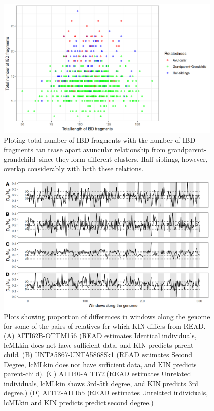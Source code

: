 \documentclass[12pt, letterpaper]{article}
\begin{document}
\begin{figure}[h!]
    \centering
    \includegraphics[width=18cm]{supplementary_info/plots/degree2_10Mwin.png}
    \caption{Ploting total number of IBD fragments with the number of IBD fragments can tease apart avuncular relationship from grandparent-grandchild, since they form different clusters. Half-siblings, however, overlap considerably with both these relations.}
    \label{figS7:second_degree}
\end{figure}


\begin{figure}[!ht]
    \centering
    \includegraphics[width=18cm]{supplementary_info/plots/egplot1.png}
    \caption{Plots showing proportion of differences in windows along the genome for some of the pairs of relatives for which KIN differs from READ. (A) AITI62B-OTTM156 (READ estimates Identical individuals, lcMLkin does not have sufficient data, and KIN predicts parent-child. (B) UNTA5867-UNTA5868Sk1 (READ estimates Second Degree, lcMLkin does not have sufficient data, and KIN predicts parent-child). (C) AITI40-AITI72 (READ estimates Unrelated individuals, lcMLkin shows 3rd-5th degree, and KIN predicts 3rd degree.)
    (D) AITI2-AITI55 (READ estimates Unrelated individuals, lcMLkin and KIN predicts predict second degree.)}
    \label{figS8:eg1}
\end{figure}
\end{document}
